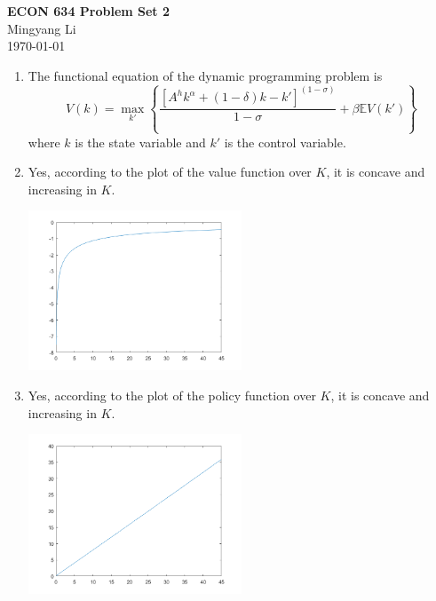 \documentclass[12pt]{article}
\begin{document}
\thispagestyle{empty}
\begin{center}
\Large{\textbf{ECON 634 Problem Set 2}}\\[3mm]
\large{{Mingyang Li}}\\[1mm]
\today
\end{center}

\begin{enumerate}
\item The functional equation of the dynamic programming problem is
$$V(k)=\max_{k'} \left\{\frac{[A^hk^\alpha+(1-\delta)k-k']^{(1-\sigma)}}{1-\sigma}+\beta\mathbb{E}V(k')\right\}$$
where $k$ is the state variable and $k'$ is the control variable.
\item Yes, according to the plot of the value function over $K$, it is concave and increasing in $K$.
\begin{center}
  \includegraphics[width=63.5mm]{VKstochastic.png}
\end{center}
\item Yes, according to the plot of the policy function over $K$, it is concave and increasing in $K$.
\begin{center}
  \includegraphics[width=63.5mm]{GKstochastic.png}
\end{center}
\end{enumerate}
\end{document}

